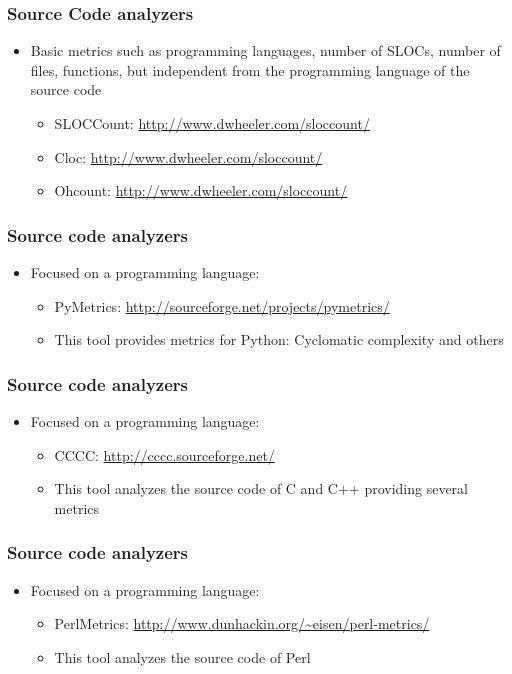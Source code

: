 \documentclass{beamer}
\begin{document}
\begin{frame}
 \frametitle{Source Code analyzers}
 \begin{itemize}
  \item Basic metrics such as programming languages,
  number of SLOCs, number of files, functions, but independent from the programming language of the source code
   \begin{itemize}
      \item SLOCCount: \url{http://www.dwheeler.com/sloccount/}
      \item Cloc: \url{http://www.dwheeler.com/sloccount/}
      \item Ohcount: \url{http://www.dwheeler.com/sloccount/}
   \end{itemize}
 \end{itemize}
\end{frame}


\begin{frame}
 \frametitle{Source code analyzers}
 \begin{itemize}
 \item Focused on a programming language:
  \begin{itemize}
    \item PyMetrics: \url{http://sourceforge.net/projects/pymetrics/}
    \item This tool provides metrics for Python: Cyclomatic complexity and others
  \end{itemize}
 \end{itemize}
\end{frame}


\begin{frame}
 \frametitle{Source code analyzers}
 \begin{itemize}
 \item Focused on a programming language:
  \begin{itemize}
    \item CCCC: \url{http://cccc.sourceforge.net/}
    \item This tool analyzes the source code of C and C++ providing several metrics
  \end{itemize}
 \end{itemize}
\end{frame}


\begin{frame}
 \frametitle{Source code analyzers}
 \begin{itemize}
 \item Focused on a programming language:
  \begin{itemize}
    \item PerlMetrics: \url{http://www.dunhackin.org/~eisen/perl-metrics/}
    \item This tool analyzes the source code of Perl
  \end{itemize}
 \end{itemize}
\end{frame}
\end{document}
